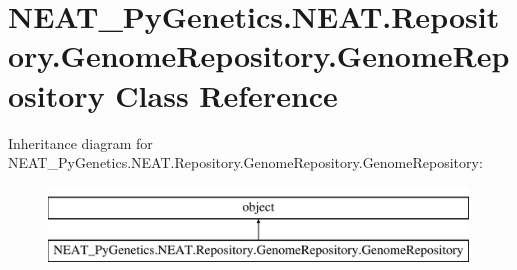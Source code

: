\hypertarget{class_n_e_a_t___py_genetics_1_1_n_e_a_t_1_1_repository_1_1_genome_repository_1_1_genome_repository}{}\section{N\+E\+A\+T\+\_\+\+Py\+Genetics.\+N\+E\+A\+T.\+Repository.\+Genome\+Repository.\+Genome\+Repository Class Reference}
\label{class_n_e_a_t___py_genetics_1_1_n_e_a_t_1_1_repository_1_1_genome_repository_1_1_genome_repository}
Inheritance diagram for N\+E\+A\+T\+\_\+\+Py\+Genetics.\+N\+E\+A\+T.\+Repository.\+Genome\+Repository.\+Genome\+Repository\+:\begin{figure}[H]
\begin{center}
\leavevmode
\includegraphics[height=2.000000cm]{class_n_e_a_t___py_genetics_1_1_n_e_a_t_1_1_repository_1_1_genome_repository_1_1_genome_repository}
\end{center}
\end{figure}
